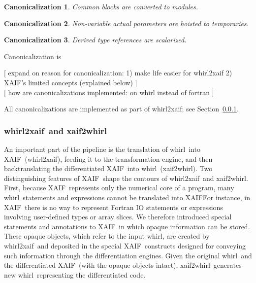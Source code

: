 \documentclass[acmtocl,acmnow]{acmtrans2m}
\newcommand{\xaif}{XAIF}
\newcommand{\whirl}{whirl}
\newcommand{\whirlToxaif}{whirl2xaif}
\newcommand{\xaifTowhirl}{xaif2whirl}
\newcommand{\refsec}[1]{Section~\ref{#1}}
\newtheorem{Can}{Canonicalization}
\begin{document}
\begin{Can}\label{can:comBlock}
Common blocks are converted to modules.
\end{Can}
\begin{Can}\label{can:param}
Non-variable actual parameters are hoisted to temporaries.
\end{Can}
\begin{Can}\label{can:scalar}
 Derived type references are scalarized.
\end{Can}	


{\color{Red}
Canonicalization is 

[ expand on reason for canonicalization: 
  1) make life easier for whirl2xaif
  2) XAIF's limited concepts (explained below) 
] \\

[ how are canonicalizations implemented: on whirl instead of fortran ] \\

}

All canonicalizations are implemented as part of \whirlToxaif; see 
\refsec{sssec:wtxxtw}.

\subsubsection{\whirlToxaif\ and \xaifTowhirl}\label{sssec:wtxxtw}

An important part of the pipeline is the translation of \whirl\ into
\xaif\ (\whirlToxaif), feeding it to the transformation engine, and
then backtranslating the differentiated \xaif\ into \whirl\
(\xaifTowhirl).  Two distinguishing features of \xaif\ shape the
contours of \whirlToxaif\ and \xaifTowhirl.  First, because \xaif\
represents only the numerical core of a program, many \whirl\
statements and expressions cannot be translated into \xaif\.  For
instance, in \xaif\ there is no way to represent Fortran IO statements
or expressions involving user-defined types or array slices.  We
therefore introduced special statements and annotations to \xaif\ in
which opaque information can be stored.  These opaque objects, which
refer to the input \whirl, are created by \whirlToxaif\ and deposited
in the special \xaif\ constructs designed for conveying such
information through the differentiation engines.  Given the original
\whirl\ and the differentiated \xaif\ (with the opaque objects
intact), \xaifTowhirl\ generates new \whirl\ representing the
differentiated code.  
\end{document}
